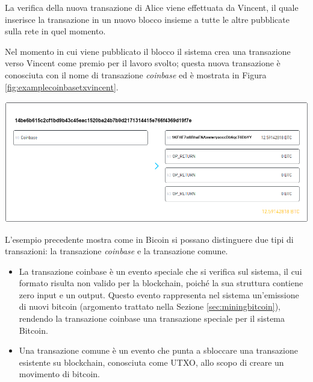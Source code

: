 \begin{example}
La verifica della nuova transazione di Alice viene effettuata da Vincent, il quale inserisce la transazione in un nuovo blocco insieme a tutte le altre pubblicate sulla rete in quel momento.

Nel momento in cui viene pubblicato il blocco il sistema crea una transazione verso Vincent come premio per il lavoro svolto; questa nuova transazione è conosciuta con il nome di transazione \emph{coinbase} ed è mostrata in Figura \ref{fig:examplecoinbasetxvincent}.

{\centering
\vspace{15pt}
\includegraphics[scale=0.35]{images/example_coinbase_vincent.png}
\vspace{10pt}
\par}

\end{example}

L'esempio precedente mostra come in Bicoin si possano distinguere due tipi di transazioni: la transazione {\it coinbase\/} e la transazione comune.
\begin{itemize}
  \item La transazione coinbase è un evento speciale che si verifica sul sistema, il cui formato risulta non valido per la blockchain, poiché la sua struttura contiene zero input e un output. Questo evento rappresenta nel sistema un’emissione di nuovi bitcoin (argomento trattato nella Sezione \ref{sec:miningbitcoin}), rendendo la transazione coinbase una transazione speciale per il sistema Bitcoin.
  \item Una transazione comune è un evento che punta a sbloccare una transazione esistente su blockchain, conosciuta come UTXO, allo scopo di   creare un movimento di bitcoin.
\end{itemize}

